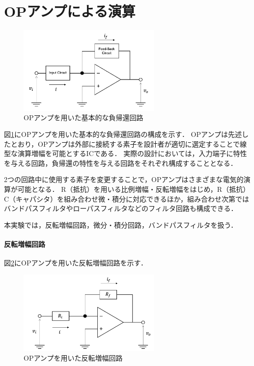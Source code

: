 \documentclass[dvipdfmx,titlepage,a4j]{jsarticle}  %
\begin{document}
\section{OPアンプによる演算}
\begin{figure}[H]
  \begin{center}
      \includegraphics[width=7cm]{../image/di-base.png}
      \caption{OPアンプを用いた基本的な負帰還回路}
      \label{fig:di:base}
  \end{center}
\end{figure}
図\ref{fig:di:base}にOPアンプを用いた基本的な負帰還回路の構成を示す．
OPアンプは先述したとおり，OPアンプは外部に接続する素子を設計者が適切に選定することで線型な演算増幅を可能とするICである．
実際の設計においては，入力端子に特性を与える回路，負帰還の特性を与える回路をそれぞれ構成することとなる．

2つの回路中に使用する素子を変更することで，OPアンプはさまざまな電気的演算が可能となる．
R（抵抗）を用いる比例増幅・反転増幅をはじめ，R（抵抗）C（キャパシタ）を組み合わせ微・積分に対応できるほか，組み合わせ次第ではバンドパスフィルタやローパスフィルタなどのフィルタ回路も構成できる．

本実験では，反転増幅回路，微分・積分回路，バンドパスフィルタを扱う．

\paragraph{反転増幅回路\\}
図\ref{fig:di:case1}にOPアンプを用いた反転増幅回路を示す．
\begin{figure}[H]
  \begin{center}
      \includegraphics[width=7cm]{../image/di-case1.png}
      \caption{OPアンプを用いた反転増幅回路}
      \label{fig:di:case1}
  \end{center}
\end{figure}
\end{document}
